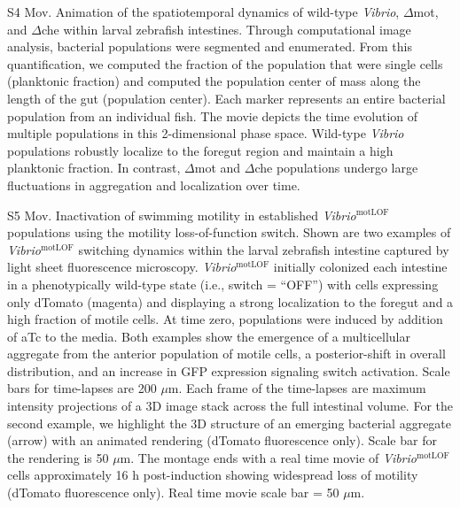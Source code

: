 {{{{{{{{{{{S4 Mov. Animation of the spatiotemporal dynamics of wild-type \textit{Vibrio}, $\Delta$mot, and $\Delta$che within larval zebrafish intestines. 
Through computational image analysis, bacterial populations were segmented and enumerated. From this quantification, we computed the fraction of the population that were single cells (planktonic fraction) and computed the population center of mass along the length of the gut (population center). Each marker represents an entire bacterial population from an individual fish. The movie depicts the time evolution of multiple populations in this 2-dimensional phase space. Wild-type \textit{Vibrio} populations robustly localize to the foregut region and maintain a high planktonic fraction. In contrast, $\Delta$mot and $\Delta$che populations undergo large fluctuations in aggregation and localization over time.

S5 Mov. Inactivation of swimming motility in established \textit{Vibrio}$^{\text{motLOF}}$ populations using the motility loss-of-function switch. 
Shown are two examples of \textit{Vibrio}$^{\text{motLOF}}$ switching dynamics within the larval zebrafish intestine captured by light sheet fluorescence microscopy. \textit{Vibrio}$^{\text{motLOF}}$ initially colonized each intestine in a phenotypically wild-type state (i.e., switch = ``OFF'') with cells expressing only dTomato (magenta) and displaying a strong localization to the foregut and a high fraction of motile cells.  At time zero, populations were induced by addition of aTc to the media. Both examples show the emergence of a multicellular aggregate from the anterior population of motile cells, a posterior-shift in overall distribution, and an increase in GFP expression signaling switch activation. Scale bars for time-lapses are 200 $\mu$m. Each frame of the time-lapses are maximum intensity projections of a 3D image stack across the full intestinal volume. For the second example, we highlight the 3D structure of an emerging bacterial aggregate (arrow) with an animated rendering (dTomato fluorescence only). Scale bar for the rendering is 50 $\mu$m. The montage ends with a real time movie of \textit{Vibrio}$^{\text{motLOF}}$ cells approximately 16 h post-induction showing widespread loss of motility (dTomato fluorescence only). Real time movie scale bar = 50 $\mu$m. 

}}}}}}}}}}}
